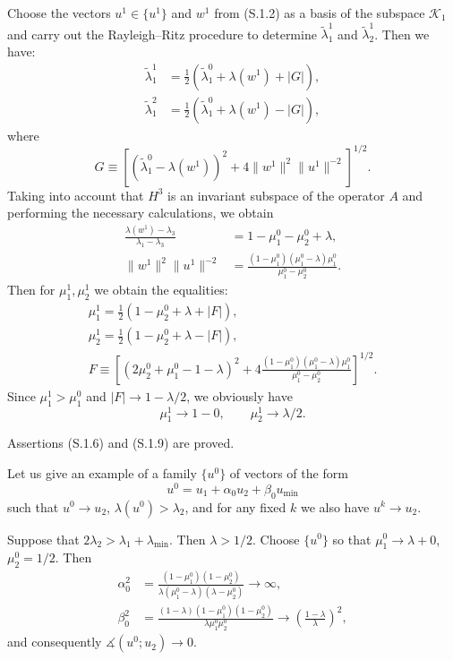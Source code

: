 \documentclass[11pt,oneside]{book}
\newcommand{\ang}{\measuredangle}
\begin{document}
Choose the vectors $u^1 \in \{u^1\}$ and $w^1$ from (S.1.2) as a basis of the subspace $\mathcal{K}_1$ and carry out the Rayleigh--Ritz procedure to determine $\tilde{\lambda}_1^1$ and $\tilde{\lambda}_2^1$. Then we have:
\begin{align*}
\tilde{\lambda}_1^1 &= \frac{1}{2}(\tilde{\lambda}_1^0 + \lambda(w^1) + |G|), \\
\tilde{\lambda}_1^2 &= \frac{1}{2}(\tilde{\lambda}_1^0 + \lambda(w^1) - |G|), %
\end{align*}
where
\[
G \equiv \left[ (\tilde{\lambda}_1^0 - \lambda(w^1))^2 + 4 \|w^1\|^2 \|u^1\|^{-2} \right]^{1/2}.
\]
Taking into account that $H^3$ is an invariant subspace of the operator $A$ and performing the necessary calculations, we obtain
\begin{align*}
\frac{\lambda(w^1) - \lambda_3}{\lambda_1 - \lambda_3} &= 1 - \mu_1^0 - \mu_2^0 + \lambda, \\[1ex]
\|w^1\|^2 \|u^1\|^{-2} &= \frac{(1 - \mu_1^0)(\mu_1^0 - \lambda)\mu_1^0}{\mu_1^0 - \mu_2^0}. %
\end{align*}
Then for $\mu_1^1, \mu_2^1$ we obtain the equalities:
\begin{gather*}
\mu_1^1 = \frac{1}{2}(1 - \mu_2^0 + \lambda + |F|), \tag{S.3.9} \\
\mu_2^1 = \frac{1}{2}(1 - \mu_2^0 + \lambda - |F|), \tag{S.3.10} \\[1ex]
F \equiv \left[ (2\mu_2^0 + \mu_1^0 - 1 - \lambda)^2 + 4 \frac{(1 - \mu_1^0)(\mu_1^0 - \lambda)\mu_1^0}{\mu_1^0 - \mu_2^0} \right]^{1/2}. \tag{S.3.11} %
\end{gather*}
Since $\mu_1^1 > \mu_1^0$ and $|F| \to 1 - \lambda/2$, we obviously have
\[
\mu_1^1 \to 1 - 0, \qquad \mu_2^1 \to \lambda/2.
\]

Assertions (S.1.6) and (S.1.9) are proved.

Let us give an example of a family $\{u^0\}$ of vectors of the form
\[
u^0 = u_1 + \alpha_0 u_2 + \beta_0 u_{\min}
\]
such that $u^0 \to u_2$, $\lambda(u^0) > \lambda_2$, and for any fixed $k$ we also have $u^k \to u_2$.

Suppose that $2\lambda_2 > \lambda_1 + \lambda_{\min}$. Then $\lambda > 1/2$. Choose $\{u^0\}$ so that $\mu_1^0 \to \lambda + 0$, $\mu_2^0 = 1/2$. Then
\begin{align*}
\alpha_0^2 &= \frac{(1 - \mu_1^0)(1 - \mu_2^0)}{\lambda(\mu_1^0 - \lambda)(\lambda - \mu_2^0)} \to \infty, \\[1ex]
\beta_0^2 &= \frac{(1 - \lambda)(1 - \mu_1^0)(1 - \mu_2^0)}{\lambda \mu_1^0 \mu_2^0} \to \left( \frac{1 - \lambda}{\lambda} \right)^2,
\end{align*}
and consequently $\ang(u^0; u_2) \to 0$.
\end{document}
